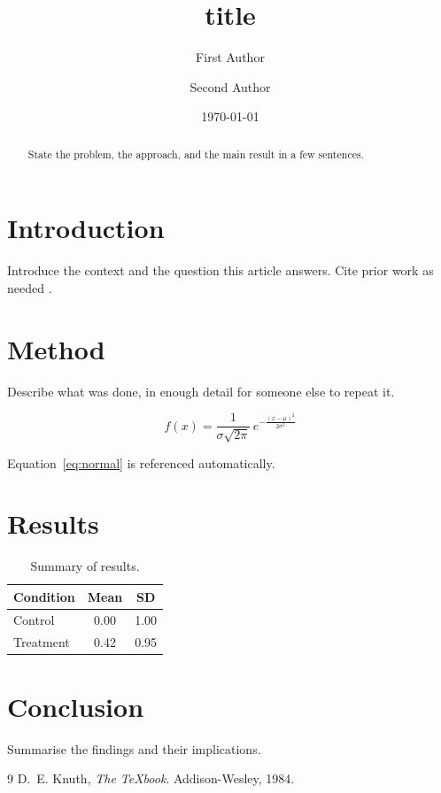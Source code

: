 \documentclass[11pt,a4paper]{article}
\title{{{title}}}
\author{First Author \and Second Author}
\date{\today}
\begin{document}
\maketitle

\begin{abstract}
State the problem, the approach, and the main result in a few sentences.
\end{abstract}

\section{Introduction}

Introduce the context and the question this article answers. Cite prior work as needed \cite{knuth1984}.

\section{Method}

Describe what was done, in enough detail for someone else to repeat it.

\begin{equation}
    f(x) = \frac{1}{\sigma\sqrt{2\pi}} \, e^{-\frac{(x-\mu)^2}{2\sigma^2}}
    \label{eq:normal}
\end{equation}

Equation~\eqref{eq:normal} is referenced automatically.

\section{Results}

\begin{table}[h]
    \centering
    \begin{tabular}{@{}lcc@{}}
        \toprule
        \textbf{Condition} & \textbf{Mean} & \textbf{SD} \\
        \midrule
        Control   & 0.00 & 1.00 \\
        Treatment & 0.42 & 0.95 \\
        \bottomrule
    \end{tabular}
    \caption{Summary of results.}
    \label{tab:results}
\end{table}

\section{Conclusion}

Summarise the findings and their implications.

\begin{thebibliography}{9}
    D.~E. Knuth, \emph{The \TeX book}. Addison-Wesley, 1984.
\end{thebibliography}
\end{document}
